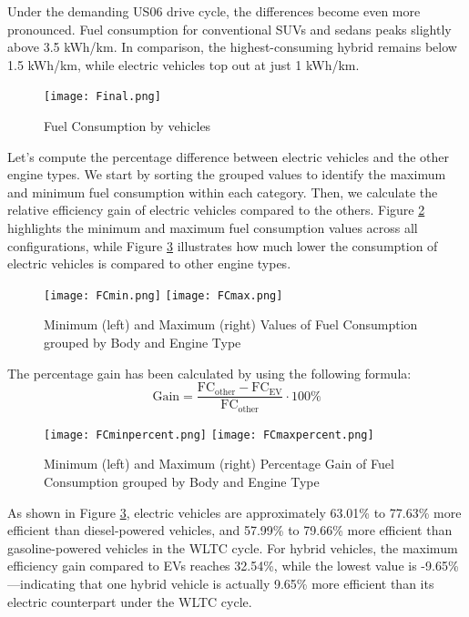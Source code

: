 		Under the demanding US06 drive cycle, the differences become even more pronounced. Fuel consumption for conventional SUVs and sedans peaks slightly above 3.5 kWh/km. In comparison, the highest-consuming hybrid remains below 1.5 kWh/km, while electric vehicles top out at just 1 kWh/km.		
	\begin{figure}[H]
		\begin{center}
			\texttt{[image: Final.png]}
		\end{center}
		\caption{Fuel Consumption by vehicles}
		\label{fig: final}
	\end{figure}
	Let's compute the percentage difference between electric vehicles and the other engine types. We start by sorting the grouped values to identify the maximum and minimum fuel consumption within each category. Then, we calculate the relative efficiency gain of electric vehicles compared to the others. Figure \ref{fig: FC_min_max} highlights the minimum and maximum fuel consumption values across all configurations, while Figure \ref{fig: percent} illustrates how much lower the consumption of electric vehicles is compared to other engine types.
	\begin{figure}[H]
		\begin{multicols}{2}
			\begin{center}
				\texttt{[image: FCmin.png]}
				\texttt{[image: FCmax.png]}
			\end{center}
		\end{multicols}
		\caption{Minimum (left) and Maximum (right) Values of Fuel Consumption grouped by Body and Engine Type}
		\label{fig: FC_min_max}
	\end{figure}
	The percentage gain has been calculated by using the following formula:
	\begin{equation*}
		\text{Gain} = \frac{\text{FC}_{\text{other}} - \text{FC}_{\text{EV}}}{\text{FC}_{\text{other}}} \cdot 100\%
	\end{equation*}
	\begin{figure}[H]
		\begin{multicols}{2}
			\begin{center}
				\texttt{[image: FCminpercent.png]}
				\texttt{[image: FCmaxpercent.png]}
			\end{center}
		\end{multicols}
		\caption{Minimum (left) and Maximum (right) Percentage Gain of Fuel Consumption grouped by Body and Engine Type}
		\label{fig: percent}
	\end{figure}
	As shown in Figure \ref{fig: percent}, electric vehicles are approximately 63.01\% to 77.63\% more efficient than diesel-powered vehicles, and 57.99\% to 79.66\% more efficient than gasoline-powered vehicles in the WLTC cycle. For hybrid vehicles, the maximum efficiency gain compared to EVs reaches 32.54\%, while the lowest value is -9.65\%—indicating that one hybrid vehicle is actually 9.65\% more efficient than its electric counterpart under the WLTC cycle.
	
